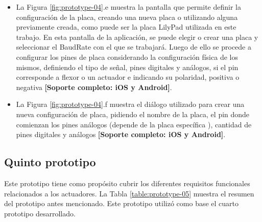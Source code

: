 \begin{itemize}
\item La Figura \ref{fig:prototype-04}.e muestra la pantalla que permite definir la configuración de la placa, creando una nueva placa o utilizando alguna previamente creada, como puede ser la placa LilyPad utilizada en este trabajo. En esta pantalla de la aplicación, se puede elegir o crear una placa y seleccionar el BaudRate con el que se trabajará. Luego de ello se procede a configurar los pines de placa considerando la configuración física de los mismos, definiendo el tipo de señal, pines digitales y análogos, si el pin corresponde a flexor o un actuador e indicando su polaridad, positiva o negativa \textbf{[Soporte completo: iOS y Android]}.

\item La Figura \ref{fig:prototype-04}.f muestra el diálogo utilizado para crear una nueva configuración de placa, pidiendo el nombre de la placa, el pin donde comienzan los pines análogos (depende de la placa específica \citep{tesis-cerda-rodrigo}), cantidad de pines digitales y análogos \textbf{[Soporte completo: iOS y Android]}.

\end{itemize}






\subsection{Quinto  prototipo}
\label{quinto-prototipo}
Este prototipo tiene como propósito cubrir los diferentes requisitos funcionales relacionados a los actuadores.  La Tabla \ref{table:prototype-05} muestra el resumen del prototipo antes mencionado. Este prototipo utilizó como base el cuarto prototipo desarrollado.


